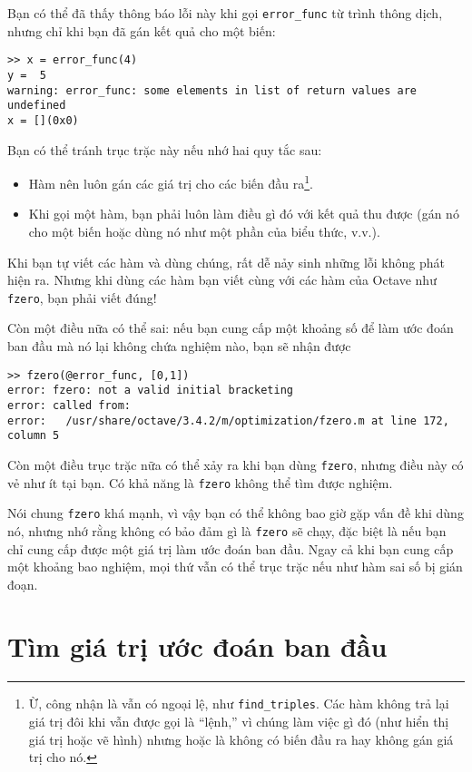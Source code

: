 \documentclass[12pt]{book}
\begin{document}
Bạn có thể đã thấy thông báo lỗi này khi gọi \verb#error_func# từ
trình thông dịch, nhưng chỉ khi bạn đã gán kết quả cho một biến:

\begin{verbatim}
>> x = error_func(4)
y =  5
warning: error_func: some elements in list of return values are undefined
x = [](0x0)
\end{verbatim}
%
Bạn có thể tránh trục trặc này nếu nhớ hai quy tắc sau:

\begin{itemize}

\item Hàm nên luôn gán các giá trị cho các biến đầu ra\footnote{Ừ,
công nhận là vẫn có ngoại lệ, như {\tt find\_triples}.  Các hàm không
trả lại giá trị đôi khi vẫn được gọi là ``lệnh,'' vì chúng làm việc gì đó 
(như hiển thị giá trị hoặc vẽ hình) nhưng hoặc là không có biến đầu ra
hay không gán giá trị cho nó.}.

\item Khi gọi một hàm, bạn phải luôn làm điều gì đó với kết quả thu được
(gán nó cho một biến hoặc dùng nó như một phần của biểu thức, v.v.).

\end{itemize}

Khi bạn tự viết các hàm và dùng chúng, rất dễ nảy sinh những lỗi không
phát hiện ra. Nhưng khi dùng các hàm bạn viết cùng với các hàm của
Octave như {\tt fzero}, bạn phải viết đúng!

Còn một điều nữa có thể sai: nếu bạn cung cấp một khoảng số để làm 
ước đoán ban đầu mà nó lại không chứa nghiệm nào, bạn sẽ nhận được

\begin{verbatim}
>> fzero(@error_func, [0,1])
error: fzero: not a valid initial bracketing
error: called from:
error:   /usr/share/octave/3.4.2/m/optimization/fzero.m at line 172, column 5
\end{verbatim}
%
Còn một điều trục trặc nữa có thể xảy ra khi bạn dùng {\tt fzero}, nhưng
điều này có vẻ như ít tại bạn. Có khả năng là {\tt fzero} không thể tìm
được nghiệm.

Nói chung {\tt fzero} khá mạnh, vì vậy bạn có thể không bao giờ gặp
vấn đề khi dùng nó, nhưng nhớ rằng không có bảo đảm gì là {\tt fzero}
sẽ chạy, đặc biệt là nếu bạn chỉ cung cấp được một giá trị làm ước đoán
ban đầu. Ngay cả khi bạn cung cấp một khoảng bao nghiệm, mọi thứ
vẫn có thể trục trặc nếu như hàm sai số bị gián đoạn.


\section{Tìm giá trị ước đoán ban đầu}
\end{document}

